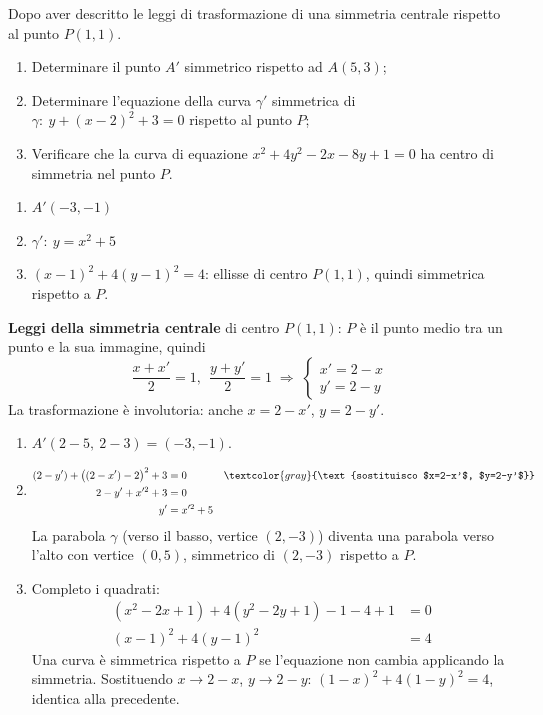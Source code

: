\begin{question}[ID=1.1, subtitle={Simmetria centrale rispetto a $P(1,1)$}, tags={trasformazioni, simmetria}, difficulty=facile]
Dopo aver descritto le leggi di trasformazione di una simmetria centrale rispetto al punto $P(1,1)$.
\begin{enumerate}
\item Determinare il punto $A'$ simmetrico rispetto ad $A(5,3)$;
\item Determinare l'equazione della curva $\gamma'$ simmetrica di $\gamma: \ y+(x-2)^2 + 3 = 0 $ rispetto al punto $P$;
\item Verificare che la curva di equazione $x^2+4y^2-2x-8y+1=0$ ha centro di simmetria nel punto $P$.
\end{enumerate}
\begin{solution}
\begin{enumerate}
    \item $A'(-3,-1)$
    \item $\gamma':\ y=x^2+5$
    \item $(x-1)^2+4(y-1)^2=4$: ellisse di centro $P(1,1)$, quindi simmetrica rispetto a $P$.
\end{enumerate}
\end{solution}
\begin{explanation}
\textbf{Leggi della simmetria centrale} di centro $P(1,1)$: $P$ è il punto medio tra un punto e la sua immagine, quindi
\[ \dfrac{x+x'}{2}=1,\ \ \dfrac{y+y'}{2}=1 \;\Rightarrow\; \begin{cases} x'=2-x\\ y'=2-y\end{cases} \]
La trasformazione è involutoria: anche $x=2-x'$, $y=2-y'$.
\begin{enumerate}
    \item $A'(2-5,\ 2-3)=(-3,-1)$.
    \item \[\begin{aligned}
    (2-y')+\big((2-x')-2\big)^2+3 &= 0 && \textcolor{gray}{\text{sostituisco $x=2-x'$, $y=2-y'$}}\\
    2-y'+x'^2+3 &= 0\\
    y' &= x'^2+5
    \end{aligned}\]
    La parabola $\gamma$ (verso il basso, vertice $(2,-3)$) diventa una parabola verso l'alto con vertice $(0,5)$, simmetrico di $(2,-3)$ rispetto a $P$.
    \item Completo i quadrati:
    \[\begin{aligned}
    (x^2-2x+1)+4(y^2-2y+1)-1-4+1 &= 0\\
    (x-1)^2+4(y-1)^2 &= 4
    \end{aligned}\]
    Una curva è simmetrica rispetto a $P$ se l'equazione non cambia applicando la simmetria. Sostituendo $x\to2-x$, $y\to2-y$: $(1-x)^2+4(1-y)^2=4$, identica alla precedente.
\end{enumerate}
\end{explanation}
\end{question}


